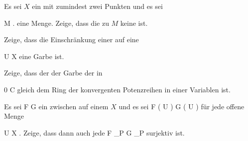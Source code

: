 {}
{





Es sei $X$ ein
mit zumindest zwei Punkten und es sei

\mavergleichskette
{\vergleichskette
{M
}
{ \neq }{ \emptyset
}
{  }{
}
{    }{
}
{   }{
}
}
{}{}{.}
eine Menge. Zeige, dass die
zu $M$ keine
ist.





}
{} {}

{}
{





Zeige, dass die Einschränkung einer
auf eine

\mavergleichskette
{\vergleichskette
{U
}
{ \subseteq }{ X
}
{  }{
}
{    }{
}
{   }{
}
}
{}{}{}
eine Garbe ist.





}
{} {}

{}
{





Zeige, dass der
der Garbe der
in

\mavergleichskette
{\vergleichskette
{ 0
}
{ \in }{ {\mathbb C}
}
{  }{
}
{    }{
}
{   }{
}
}
{}{}{}
gleich dem Ring der konvergenten Potenzreihen in einer Variablen ist.





}
{} {}

{}
{





Es sei
\maabb {\varphi} { { \mathcal  F   } } { { \mathcal  G   }
} {}
ein
zwischen
auf einem
$X$ und es sei
 { { \mathcal  F   }  \left(   U   \right) } { { \mathcal  G   }  \left(   U   \right)
} {}
für jede offene Menge

\mavergleichskette
{\vergleichskette
{U
}
{ \subseteq }{ X
}
{  }{
}
{    }{
}
{   }{
}
}
{}{}{.}
Zeige, dass dann auch jede
 { { \mathcal  F   }_P } { { \mathcal  G   }_P
} {}
surjektiv ist.





}
{} {}

